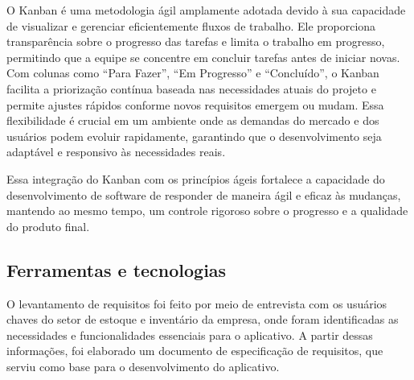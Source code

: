 O Kanban é uma metodologia ágil amplamente adotada devido à sua capacidade de visualizar e gerenciar eficientemente fluxos de trabalho. Ele proporciona transparência sobre o progresso das tarefas e limita o trabalho em progresso, permitindo que a equipe se concentre em concluir tarefas antes de iniciar novas. Com colunas como “Para Fazer”, “Em Progresso” e “Concluído”, o Kanban facilita a priorização contínua baseada nas necessidades atuais do projeto e permite ajustes rápidos conforme novos requisitos emergem ou mudam. Essa flexibilidade é crucial em um ambiente onde as demandas do mercado e dos usuários podem evoluir rapidamente, garantindo que o desenvolvimento seja adaptável e responsivo às necessidades reais.

Essa integração do Kanban com os princípios ágeis fortalece a capacidade do desenvolvimento de software de responder de maneira ágil e eficaz às mudanças, mantendo ao mesmo tempo, um controle rigoroso sobre o progresso e a qualidade do produto final.

\subsection{Ferramentas e tecnologias}

O levantamento de requisitos foi feito por meio de entrevista com os usuários chaves do setor de estoque e inventário da empresa, onde foram identificadas as necessidades e funcionalidades essenciais para o aplicativo. A partir dessas informações, foi elaborado um documento de especificação de requisitos, que serviu como base para o desenvolvimento do aplicativo.

